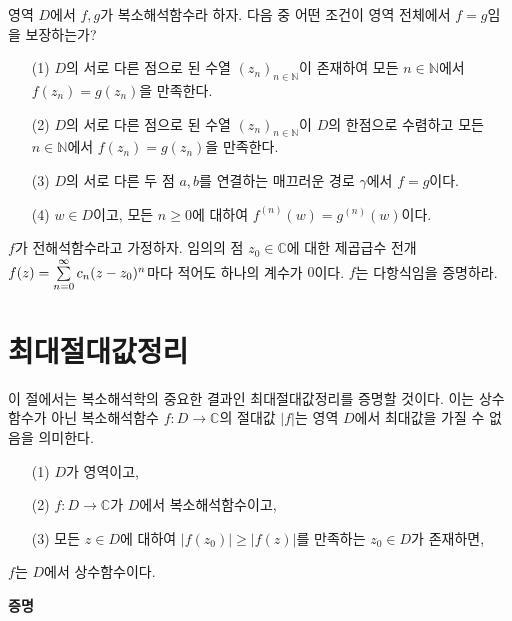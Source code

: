 \begin{salt_exercise} \label{ex-4-24}
영역 $D$에서 $f,g$가 복소해석함수라 하자.
다음 중 어떤 조건이 영역 전체에서 $f=g$임을 보장하는가?
\begin{itemize}
\item[(1)] 
$D$의 서로 다른 점으로 된 수열 $(z_n)_{n\in\mathbb N}$이 존재하여
모든 $n\in \mathbb N$에서 $f(z_n) = g(z_n)$을 만족한다.
\item[(2)] $D$의 서로 다른 점으로 된 수열 $(z_n)_{n\in\mathbb N}$이 $D$의 한점으로 수렴하고
모든 $n\in \mathbb N$에서 $f(z_n) = g(z_n)$을 만족한다.
\item[(3)] $D$의 서로 다른 두 점 $a,b$를 연결하는 매끄러운 경로 $\gamma$에서
$f=g$이다.
\item[(4)]  $w\in D$이고, 모든 $n\ge0$에 대하여 $f^{(n)}(w) = g^{(n)}(w)$이다.
\end{itemize}
\end{salt_exercise}

\begin{salt_exercise} \label{ex-4-25}
$f$가 전해석함수라고 가정하자.
임의의 점 $z_0\in \mathbb C$에 대한 제곱급수 전개
$f(z) = \sum\limits_{n=0}^\infty c_n(z-z_0)^n$마다 적어도 하나의 계수가 $0$이다.
$f$는 다항식임을 증명하라.
\end{salt_exercise}

\section{최대절대값정리} \label{sec-4-6}

이 절에서는 복소해석학의 중요한 결과인  최대절대값정리를 증명할 것이다.
이는 상수함수가 아닌 복소해석함수 $f:D\to\mathbb C$의 절대값 $|f|$는 영역 $D$에서
최대값을 가질 수 없음을 의미한다.

\begin{salttheorem} [최대절대값정리] {}{} \label{thm-4-6}

\begin{itemize}
\item[(1)] $D$가 영역이고,
\item[(2)] $f:D\to\mathbb C$가 $D$에서 복소해석함수이고,
\item[(3)] 모든 $z\in D$에 대하여 $|f(z_0)| \ge |f(z)|$를 만족하는 $z_0\in D$가 존재하면,
\end{itemize}
$f$는 $D$에서 상수함수이다.
\end{salttheorem}

{\bf 증명}

